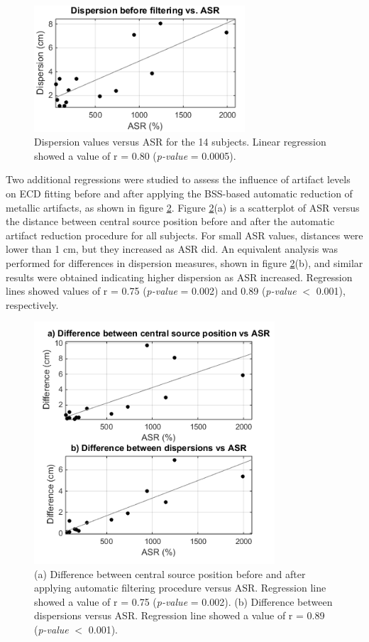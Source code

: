 \begin{figure}[!h]
\centering
\includegraphics[width=0.7\textwidth]{Images/fig2-7.png}
\caption{Dispersion values versus ASR for the 14 subjects. Linear regression showed a value of r = 0.80 (\textit{p-value} = 0.0005).}
\label{fig:2-7}
\end{figure} 

Two additional regressions were studied to assess the influence of artifact levels on ECD fitting before and after applying the BSS-based automatic reduction of metallic artifacts, as shown in figure \ref{fig:2-8}. Figure \ref{fig:2-8}(a) is a scatterplot of ASR versus the distance between central source position before and after the automatic artifact reduction procedure for all subjects. For small ASR values, distances were lower than 1 cm, but they increased as ASR did. An equivalent analysis was performed for differences in dispersion measures, shown in figure \ref{fig:2-8}(b), and similar results were obtained indicating higher dispersion as ASR increased. Regression lines showed values of r = 0.75 (\textit{p-value} = 0.002) and 0.89 (\textit{p-value} $<$ 0.001), respectively.

\begin{figure}[!h]
\centering
\includegraphics[width=0.8\textwidth]{Images/fig2-8.png}
\caption{(a) Difference between central source position before and after applying automatic filtering procedure versus ASR. Regression line showed a value of r = 0.75 (\textit{p-value} = 0.002). (b) Difference between dispersions versus ASR. Regression line showed a value of r = 0.89 (\textit{p-value} $<$ 0.001).}
\label{fig:2-8}
\end{figure} 


